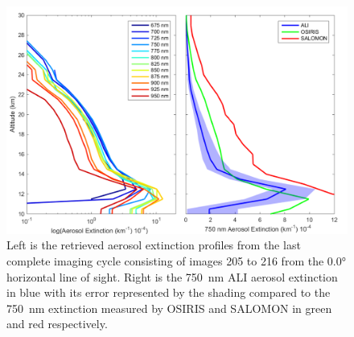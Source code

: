 \documentclass[12pt]{article}
\begin{document}
\clearpage

\begin{figure}
\includegraphics[width=1.0\textwidth]{./Images/5-3-FullAerosolCycleComparison.pdf}
    \caption{Left is the retrieved aerosol extinction profiles from the last complete imaging cycle consisting of images 205 to 216 from the 0.0\si{\degree} horizontal line of
sight. Right is the 750~nm ALI aerosol extinction in blue with its error represented by the shading compared to the 750~nm extinction measured by OSIRIS and SALOMON in green
and red respectively.}
    \label{fig:AliAerosolCycle}
\end{figure}

\clearpage
\end{document}
